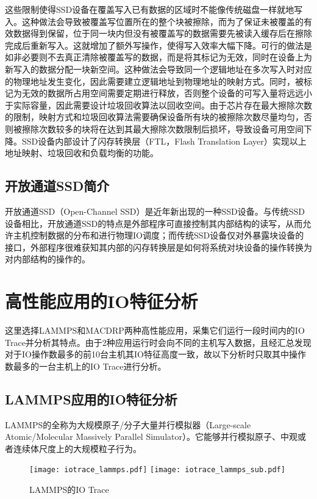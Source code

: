 这些限制使得SSD设备在覆盖写入已有数据的区域时不能像传统磁盘一样就地写入。这种做法会导致被覆盖写位置所在的整个块被擦除，而为了保证未被覆盖的有效数据得到保留，位于同一块内但没有被覆盖写的数据需要先被读入缓存后在擦除完成后重新写入。这就增加了额外写操作，使得写入效率大幅下降。可行的做法是如非必要则不去真正清除被覆盖写的数据，而是将其标记为无效，同时在设备上为新写入的数据分配一块新空间。这种做法会导致同一个逻辑地址在多次写入时对应的物理地址发生变化，因此需要建立逻辑地址到物理地址的映射方式。同时，被标记为无效的数据所占用空间需要定期进行释放，否则整个设备的可写入量将远远小于实际容量，因此需要设计垃圾回收算法以回收空间。由于芯片存在最大擦除次数的限制，映射方式和垃圾回收算法需要确保设备所有块的被擦除次数尽量均匀，否则被擦除次数较多的块将在达到其最大擦除次数限制后损坏，导致设备可用空间下降。SSD设备内部设计了闪存转换层（FTL，Flash Translation Layer）实现以上地址映射、垃圾回收和负载均衡的功能。

\subsection{开放通道SSD简介}
开放通道SSD（Open-Channel SSD）是近年新出现的一种SSD设备。与传统SSD设备相比，开放通道SSD的特点是外部程序可直接控制其内部结构的读写，从而允许主机控制数据的分布和进行物理IO调度；而传统SSD设备仅对外暴露块设备的接口，外部程序很难获知其内部的闪存转换层是如何将系统对块设备的操作转换为对内部结构的操作的。

\section{高性能应用的IO特征分析}
这里选择LAMMPS和MACDRP两种高性能应用，采集它们运行一段时间内的IO Trace并分析其特点。由于2种应用运行时会向不同的主机写入数据，且经汇总发现对于IO操作数最多的前10台主机其IO特征高度一致，故以下分析时只取其中操作数最多的一台主机上的IO Trace进行分析。
\subsection{LAMMPS应用的IO特征分析}
LAMMPS的全称为大规模原子/分子大量并行模拟器（Large-scale Atomic/Molecular Massively Parallel Simulator）。它能够并行模拟原子、中观或者连续体尺度上的大规模粒子行为。

\begin{figure}[H]
  \centering
    {\texttt{[image: iotrace\_lammps.pdf]}}
  \hspace{4em}
      {\texttt{[image: iotrace\_lammps\_sub.pdf]}}
  \caption{LAMMPS的IO Trace}
  \label{fig:iotrace_lammps_all}
\end{figure}

